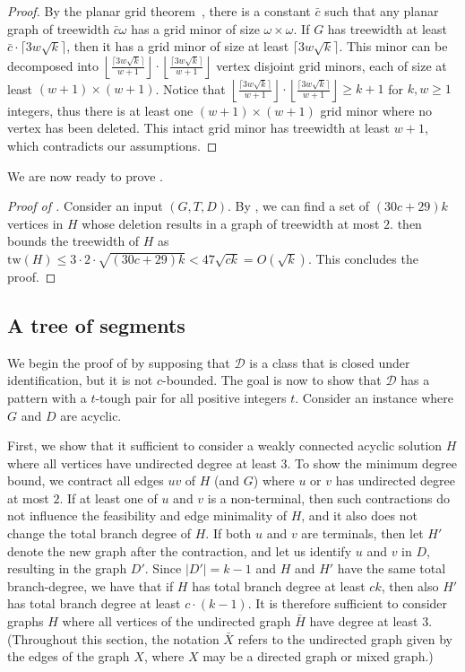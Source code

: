 \documentclass[a4paper,11pt]{article}
\newcommand{\calD}{\mathcal{D}}
\newcommand{\tw}{\mathrm{tw}}
\theoremstyle{plain}
\newtheorem{identification rule}{Identification Rule}
\theoremstyle{definition}
\theoremstyle{remark}
\begin{document}
\begin{proof}
By the planar grid theorem~\cite{RobertsonST94}, there is a constant $\bar c$ such that any planar graph of treewidth $\bar c \omega$ has a grid minor of size $\omega \times \omega$. If $G$ has treewidth at least $\bar c \cdot \lceil 3w\sqrt{k}\rceil$, then it has a grid minor of size at least $\lceil 3w\sqrt{k}\rceil$. This minor can be decomposed into $\left\lfloor \frac{ \lceil 3w\sqrt{k}\rceil}{w+1}\right\rfloor \cdot \left\lfloor \frac{ \lceil 3w\sqrt{k}\rceil}{w+1}\right\rfloor$ vertex disjoint grid minors, each of size at least $(w+1)\times(w+1)$. Notice that $\left\lfloor \frac{ \lceil 3w\sqrt{k}\rceil}{w+1}\right\rfloor \cdot \left\lfloor \frac{ \lceil 3w\sqrt{k}\rceil}{w+1}\right\rfloor\geq k+1$ for $k,w\geq 1$ integers, thus there is at least one $(w+1)\times(w+1)$ grid minor where no vertex has been deleted. This intact grid minor has treewidth at least $w+1$, which contradicts our assumptions.
\end{proof}

We are now ready to prove .

\begin{proof}[Proof of ]
Consider an input $(G,T,D)$. By , we can find a set of $(30c+29)k$ vertices in $H$ whose deletion results in a graph of treewidth at most $2$.  then bounds the treewidth of $H$ as $\tw(H)\leq 3\cdot 2 \cdot \sqrt{(30c+29)k}< 47\sqrt{ck}=O(\sqrt{k})$.
This concludes the proof.
\end{proof}
\subsection{A tree of segments}\label{sec:skeleton}

We begin the proof of  by supposing that $\calD$ is a class that is closed under identification, but it is not $c$-bounded. The goal is now to show that $\calD$ has a pattern with a $t$-tough pair for all positive integers $t$. Consider an instance where $G$ and $D$ are acyclic.

First, we show that it sufficient to consider a weakly connected acyclic solution $H$ where all vertices have undirected degree at least $3$. To show the minimum degree bound, we contract all edges $uv$ of $H$ (and $G$) where $u$ or $v$ has undirected degree at most $2$. If at least one of $u$ and $v$ is a non-terminal, then such contractions do not influence the feasibility and edge minimality of $H$, and it also does not change the total branch degree of $H$. If both $u$ and $v$ are terminals, then let $H'$ denote the new graph after the contraction, and let us identify $u$ and $v$ in $D$, resulting in the graph $D'$. Since $|D'|=k-1$ and $H$ and $H'$ have the same total branch-degree, we have that if $H$ has total branch degree at least $ck$, then also $H'$ has total branch degree at least $c\cdot (k-1)$. It is therefore sufficient to consider graphs $H$ where all vertices of the undirected graph $\bar H$ have degree at least $3$. (Throughout this section, the notation $\bar{X}$ refers to the undirected graph given by the edges of the graph $X$, where $X$ may be a directed graph or mixed graph.) 
\end{document}
